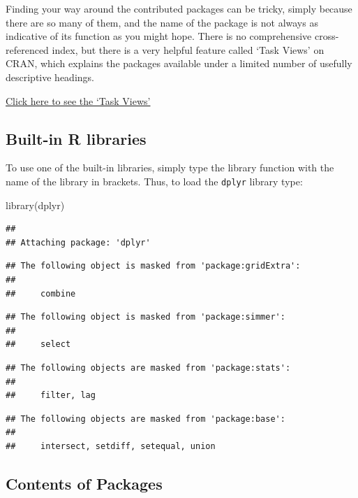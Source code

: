 \documentclass[
]{book}
\newenvironment{Shaded}{\begin{snugshade}}{\end{snugshade}}
\newcommand{\FunctionTok}[1]{\textcolor[rgb]{0.00,0.00,0.00}{#1}}
\newcommand{\NormalTok}[1]{#1}
\theoremstyle{definition}
\theoremstyle{definition}
\theoremstyle{definition}
\theoremstyle{definition}
\theoremstyle{remark}
\begin{document}
Finding your way around the contributed packages can be tricky, simply because there are so many of them, and the name of the package is not always as indicative of its function as you might hope. There is no comprehensive cross-referenced index, but there is a very helpful feature called `Task Views' on CRAN, which explains the packages available under a limited number of usefully descriptive headings.

\href{https://cran.r-project.org/}{Click here to see the `Task Views'}

\hypertarget{built-in-r-libraries}{%
\subsection{Built-in R libraries}\label{built-in-r-libraries}}

To use one of the built-in libraries, simply type the library function with the name of the library in brackets. Thus, to load the \texttt{dplyr} library type:

\begin{Shaded}
\begin{Highlighting}[]
\FunctionTok{library}\NormalTok{(dplyr)}
\end{Highlighting}
\end{Shaded}

\begin{verbatim}
## 
## Attaching package: 'dplyr'
\end{verbatim}

\begin{verbatim}
## The following object is masked from 'package:gridExtra':
## 
##     combine
\end{verbatim}

\begin{verbatim}
## The following object is masked from 'package:simmer':
## 
##     select
\end{verbatim}

\begin{verbatim}
## The following objects are masked from 'package:stats':
## 
##     filter, lag
\end{verbatim}

\begin{verbatim}
## The following objects are masked from 'package:base':
## 
##     intersect, setdiff, setequal, union
\end{verbatim}

\hypertarget{contents-of-packages}{%
\subsection{Contents of Packages}\label{contents-of-packages}}
\end{document}
